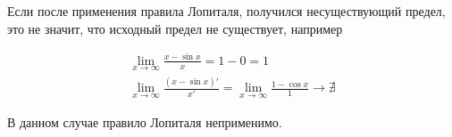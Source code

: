 \begin{remark}
  Если после применения правила Лопиталя, получился несуществующий предел, это
  не значит, что исходный предел не существует, например

  \begin{equation*}
    \begin{aligned}
      \lim_{x \to \infty} \frac{x - \sin x}{x} = 1 - 0 = 1
    \\
      \lim_{x \to \infty} \frac{(x - \sin x)'}{x'}
      = \lim_{x \to \infty} \frac{1 - \cos x}{1} \to \nexists
    \end{aligned}
  \end{equation*}

  В данном случае правило Лопиталя неприменимо.
\end{remark}
